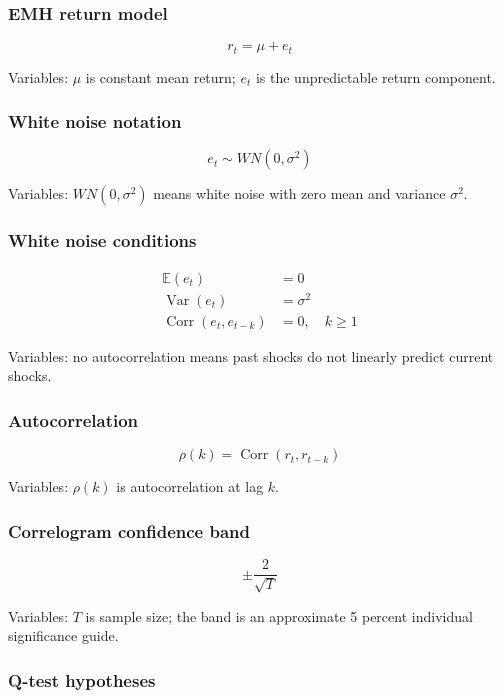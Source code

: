 \documentclass[
  8pt,
  twocolumn]{extarticle}
\begin{document}
\subsubsection{EMH return model}\label{emh-return-model}

\[
r_t=\mu+e_t
\]

Variables: \(\mu\) is constant mean return; \(e_t\) is the unpredictable
return component.

\subsubsection{White noise notation}\label{white-noise-notation}

\[
e_t\sim WN(0,\sigma^2)
\]

Variables: \(WN(0,\sigma^2)\) means white noise with zero mean and
variance \(\sigma^2\).

\subsubsection{White noise conditions}\label{white-noise-conditions}

\[
\begin{aligned}
\mathbb E(e_t)&=0\\
\operatorname{Var}(e_t)&=\sigma^2\\
\operatorname{Corr}(e_t,e_{t-k})&=0,\quad k\ge1
\end{aligned}
\]

Variables: no autocorrelation means past shocks do not linearly predict
current shocks.

\subsubsection{Autocorrelation}\label{autocorrelation}

\[
\rho(k)=\operatorname{Corr}(r_t,r_{t-k})
\]

Variables: \(\rho(k)\) is autocorrelation at lag \(k\).

\subsubsection{Correlogram confidence
band}\label{correlogram-confidence-band}

\[
\pm\frac{2}{\sqrt T}
\]

Variables: \(T\) is sample size; the band is an approximate 5 percent
individual significance guide.

\subsubsection{Q-test hypotheses}\label{q-test-hypotheses}
\end{document}
